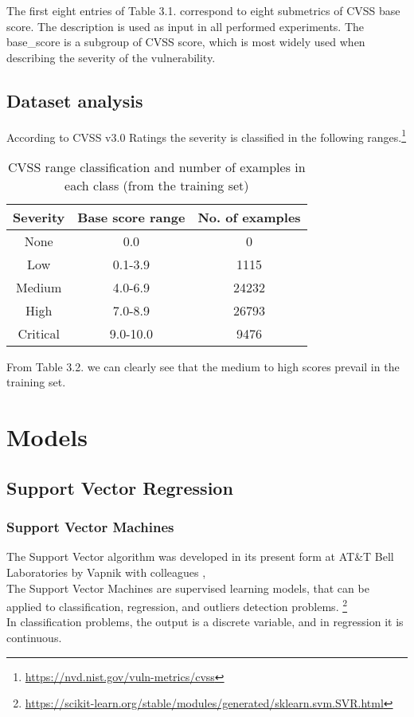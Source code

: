 \documentclass[times, utf8, zavrsni, english]{fer}
\begin{document}
\noindent The first eight entries of Table 3.1. correspond to eight submetrics of CVSS base score.
The description is used as input in all performed experiments.
The base\_score is a subgroup of CVSS score, which is most widely used when describing the severity of the vulnerability.

\section{Dataset analysis}
According to CVSS v3.0 Ratings the severity is classified in the following ranges.\footnote{\url{https://nvd.nist.gov/vuln-metrics/cvss}}
\begin{table}[h!]
	\centering
	\begin{tabular}{| c c c ||} 
		\hline
		Severity & Base score range & No. of examples\\ [0.5ex] 
		\hline\hline
		
		None & 0.0 & 0  \\
		Low &  0.1-3.9 & 1115 \\
		Medium & 4.0-6.9 & 24232  \\
		High & 7.0-8.9  & 26793 \\
		Critical & 9.0-10.0 & 9476\\
		\hline
	\end{tabular}
	\caption{CVSS range classification and number of examples in each class (from the training set)}
	\label{table:2}
\end{table}

\noindent From Table 3.2. we can clearly see that the medium to high scores prevail in the training set.

\chapter{Models}

\section{Support Vector Regression}
\subsection{Support Vector Machines}
The Support Vector algorithm was developed in its present form at AT\&T Bell Laboratories by Vapnik with colleagues \citep{boser}, \citep{smola} \\
The Support Vector Machines are supervised learning models, that can be applied to classification, regression, and outliers detection problems. \footnote{\url{https://scikit-learn.org/stable/modules/generated/sklearn.svm.SVR.html}} \\
In classification problems, the output is a discrete variable, and in regression it is continuous. \\
\end{document}
